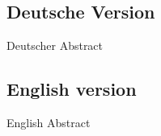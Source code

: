 
\subsection*{Deutsche Version}

Deutscher Abstract

\newpage

\subsection*{English version}

English Abstract